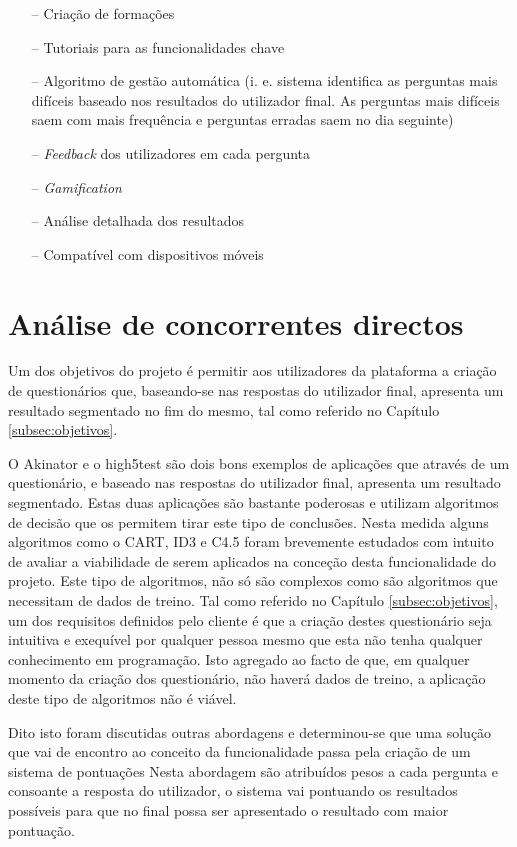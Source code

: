 \begin{itemize}
	\item[--] Criação de formações 
	\item[--] Tutoriais para as funcionalidades chave
	\item[--] Algoritmo de gestão automática (i. e. sistema identifica as perguntas mais difíceis baseado nos resultados do utilizador final. As perguntas mais difíceis saem com mais frequência e perguntas erradas saem no dia seguinte)
	\item[--] \textit{Feedback }dos utilizadores em cada pergunta
	\item[--] \textit{Gamification}
	\item[--] Análise detalhada dos resultados
	\item[--] Compatível com dispositivos móveis
\end{itemize}

\section{Análise de concorrentes directos}

Um dos objetivos do projeto é permitir aos utilizadores da plataforma a criação de questionários que, baseando-se nas respostas do utilizador final, apresenta um resultado  segmentado no fim do mesmo, tal como referido no Capítulo \ref{subsec:objetivos}.

O Akinator\cite{akinator} e o high5test\cite{5} são dois bons exemplos de aplicações que através de um questionário, e baseado nas respostas do utilizador final, apresenta um resultado segmentado. Estas duas aplicações são bastante poderosas e utilizam algoritmos de decisão que os permitem tirar este tipo de conclusões. Nesta medida alguns algoritmos como o CART\cite{cart}, ID3\cite{id3}\cite{id3_2}\cite{cart} e C4.5\cite{cart}\cite{c4.5} foram brevemente estudados com intuito de avaliar a viabilidade de serem aplicados na conceção desta funcionalidade do projeto. Este tipo de algoritmos, não só são complexos como são algoritmos que necessitam de dados de treino. Tal como referido no Capítulo \ref{subsec:objetivos}, um dos requisitos definidos pelo cliente é que a criação destes questionário seja intuitiva e exequível por qualquer pessoa mesmo que esta não tenha qualquer conhecimento em programação. Isto agregado ao facto de que, em qualquer momento da criação dos questionário, não haverá dados de treino, a aplicação deste tipo de algoritmos não é viável.

Dito isto foram discutidas outras abordagens e determinou-se que uma solução que vai de encontro ao conceito da funcionalidade passa pela criação de um sistema de pontuações
Nesta abordagem são atribuídos pesos a cada pergunta e consoante a resposta do utilizador, o sistema vai pontuando os resultados possíveis para que no final possa ser apresentado o resultado com maior pontuação.

